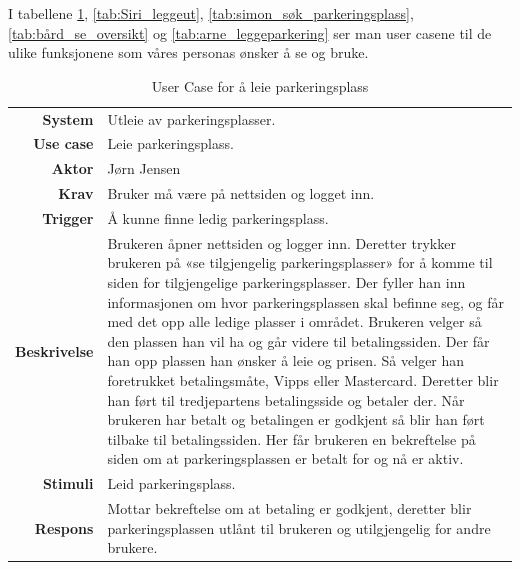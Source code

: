 I tabellene \ref{tab:leie_Jørn}, \ref{tab:Siri_leggeut},  \ref{tab:simon_søk_parkeringsplass}, \ref{tab:bård_se_oversikt} og \ref{tab:arne_leggeparkering} ser man user casene til de ulike funksjonene som våres personas ønsker å se og bruke.


\begin{table}[H]
\begin{tabularx}{\textwidth}{r|X}
\textbf{System}      & Utleie av parkeringsplasser. \\ [.5em]
\textbf{Use case}    & Leie parkeringsplass. \\ [.5em]
\textbf{Aktor}       & Jørn Jensen  \\ [.5em]
\textbf{Krav}        & Bruker må være på nettsiden og logget inn. \\ [.5em]
\textbf{Trigger}     & Å kunne finne ledig parkeringsplass. \\ [.5em]
\textbf{Beskrivelse} & Brukeren åpner nettsiden og logger inn. Deretter trykker brukeren på «se tilgjengelig parkeringsplasser» for å  komme til siden for tilgjengelige parkeringsplasser. Der fyller han inn informasjonen om hvor parkeringsplassen skal befinne seg, og får med det opp alle ledige plasser i området. Brukeren velger så den plassen han vil ha og går videre til betalingssiden. Der får han opp plassen han ønsker å leie og prisen. Så velger han foretrukket betalingsmåte, Vipps eller Mastercard. Deretter blir han ført til tredjepartens betalingsside og betaler der. Når brukeren har betalt og betalingen er godkjent så blir han ført tilbake til betalingssiden. Her får brukeren en bekreftelse på siden om at parkeringsplassen er betalt for og nå er aktiv. \vspace{0.5em} \\ 
\textbf{Stimuli}     & Leid parkeringsplass. \\ [.5em]
\textbf{Respons}     & Mottar bekreftelse om at betaling er godkjent, deretter blir  parkeringsplassen utlånt til brukeren og utilgjengelig for andre brukere.        
\end{tabularx}
    \caption{User Case for å leie parkeringsplass }
    \label{tab:leie_Jørn}
\end{table}


